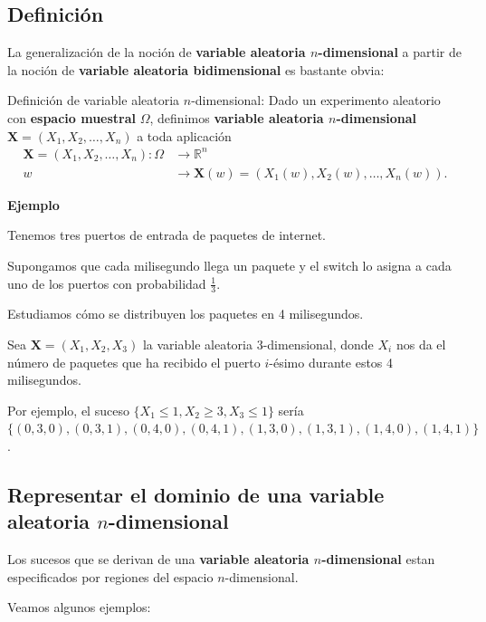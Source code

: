 \documentclass[]{book}
\begin{document}
\hypertarget{definiciuxf3n-5}{%
\subsection{Definición}\label{definiciuxf3n-5}}

La generalización de la noción de \textbf{variable aleatoria \(n\)-dimensional} a partir de la noción de \textbf{variable aleatoria bidimensional} es bastante obvia:

Definición de variable aleatoria \(n\)-dimensional:
Dado un experimento aleatorio con \textbf{espacio muestral} \(\Omega\), definimos \textbf{variable aleatoria \(n\)-dimensional} \(\mathbf{X}=(X_1,X_2,\ldots,X_n)\) a toda aplicación
\[
\begin{array}{rl}
\mathbf{X}=(X_1,X_2,\ldots,X_n): \Omega & \longrightarrow \mathbb{R}^n\\
w & \longrightarrow \mathbf{X}(w)=(X_1(w),X_2(w),\ldots,X_n(w)).
\end{array}
\]

\textbf{Ejemplo}

Tenemos tres puertos de entrada de paquetes de internet.

Supongamos que cada milisegundo llega un paquete y el switch lo asigna a cada uno de los puertos con probabilidad \(\frac{1}{3}\).

Estudiamos cómo se distribuyen los paquetes en 4 milisegundos.

Sea \(\mathbf{X}=(X_1,X_2,X_3)\) la variable aleatoria 3-dimensional, donde \(X_i\) nos da el número de paquetes que ha recibido el puerto \(i\)-ésimo durante estos 4 milisegundos.

Por ejemplo, el suceso \(\{X_1\leq 1, X_2\geq 3, X_3\leq 1\}\) sería \(\{(0,3,0),(0,3,1),(0,4,0),(0,4,1),(1,3,0),(1,3,1),(1,4,0),(1,4,1)\}\).

\hypertarget{representar-el-dominio-de-una-variable-aleatoria-n-dimensional}{%
\subsection{\texorpdfstring{Representar el dominio de una variable aleatoria \(n\)-dimensional}{Representar el dominio de una variable aleatoria n-dimensional}}\label{representar-el-dominio-de-una-variable-aleatoria-n-dimensional}}

Los sucesos que se derivan de una \textbf{variable aleatoria \(n\)-dimensional} estan especificados por regiones del espacio \(n\)-dimensional.

Veamos algunos ejemplos:
\end{document}
